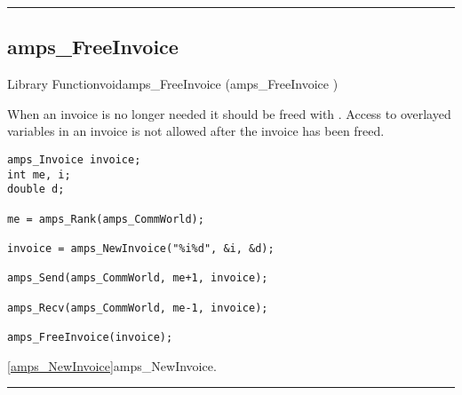 
\noindent\rule{\textwidth}{1mm}

\subsection{amps\_FreeInvoice}
\label{amps_FreeInvoice}


\begin{deftypefn}{Library Function}{void}{amps\_FreeInvoice}
(amps_FreeInvoice )

\DESCRIPTION

When an invoice is no longer needed it should be freed with
.  Access to overlayed variables in an invoice is
not allowed after the invoice has been freed.

\EXAMPLE
\begin{display}\begin{verbatim}
amps_Invoice invoice;
int me, i;
double d;

me = amps_Rank(amps_CommWorld);

invoice = amps_NewInvoice("%i%d", &i, &d);

amps_Send(amps_CommWorld, me+1, invoice);

amps_Recv(amps_CommWorld, me-1, invoice);

amps_FreeInvoice(invoice);

\end{verbatim}\end{display}

\SEEALSO
\vref{amps_NewInvoice}{amps\_NewInvoice}. \\

\end{deftypefn}



\noindent\rule{\textwidth}{1mm}

